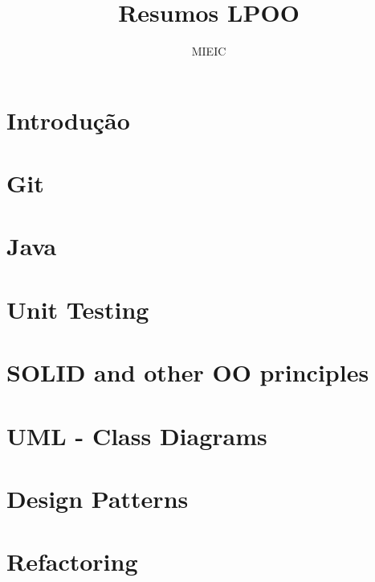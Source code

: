 \documentclass{article}
\title{Resumos LPOO}
\author{MIEIC}
\begin{document}
  
\maketitle

\tableofcontents

\section{Introdução}



\section{Git}



\section{Java}



\section{Unit Testing}
 


\section{SOLID and other OO principles}
 


\section{UML - Class Diagrams}
 


\section{Design Patterns}
 


\section{Refactoring}
 

\end{document}
